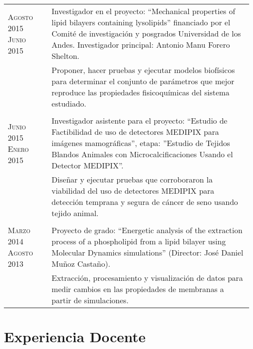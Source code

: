 \documentclass[a4paper,10pt]{article} %
\begin{document}
\begin{tabular}{p{2.2cm}p{12.5cm}}

\textsc{Agosto 2015} \newline  \textsc{Junio 2015} & Investigador en el proyecto: ``Mechanical properties of lipid bilayers containing
 lysolipids'' financiado por el Comité de investigación y posgrados Universidad
de los Andes. Investigador principal: Antonio Manu Forero Shelton. \\
& Proponer, hacer pruebas y ejecutar modelos biofísicos para determinar el conjunto de parámetros que mejor reproduce las propiedades fisicoquímicas del sistema estudiado. \\
\\ 
\textsc{Junio 2015} \newline \textsc{Enero 2015} & Investigador asistente para el proyecto: ``Estudio de Factibilidad de uso de detectores MEDIPIX para imágenes mamográficas'', etapa: ''Estudio de Tejidos  
Blandos Animales con Microcalciﬁcaciones Usando el Detector MEDIPIX''. \\
& Diseñar y ejecutar pruebas que corroboraron la viabilidad del uso de detectores  
MEDIPIX para detección temprana y segura de cáncer de seno usando 
tejido animal. \\
\\
\textsc{Marzo 2014} \newline \textsc{Agosto 2013}  & Proyecto de grado: ``Energetic analysis of the  extraction process of a phospholipid
from a lipid bilayer using Molecular Dynamics simulations'' (Director: Jos\'e Daniel Mu\~noz Casta\~no). \\
& Extracción, procesamiento y visualización de datos para medir cambios en las 
propiedades de membranas a partir de simulaciones.

\end{tabular}



\color{OrangeRed}
\section{Experiencia Docente}
\color{black}
\end{document}
